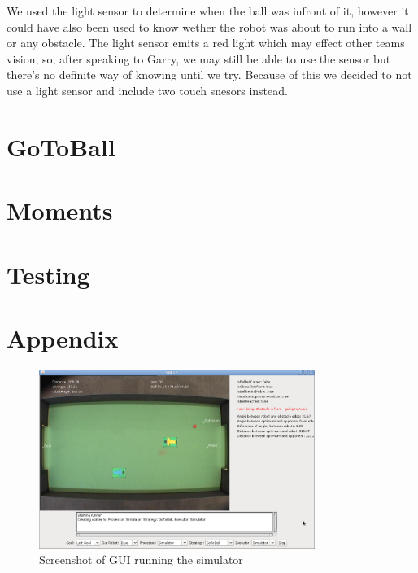 \documentclass[conference,12pt]{IEEEtran}
\begin{document}
We used the light sensor to determine when the ball was infront of it, however it could have also been used to know wether the robot was about to run into a wall or any obstacle. The light sensor emits a red light which may effect other teams vision, so, after speaking to Garry, we may still be able to use the sensor but there's no definite way of knowing until we try. Because of this we decided to not use a light sensor and include two touch snesors instead.

\section{GoToBall}


\section{Moments}


\section{Testing}


\pagebreak

\section{Appendix}
\begin{figure}[htp]
\begin{center}
\leavevmode
\includegraphics[width=0.8\textwidth] {GUI.png}
\end{center}
\caption{Screenshot of GUI running the simulator}
\label{fig:GUI}
\end{figure}
\end{document}
